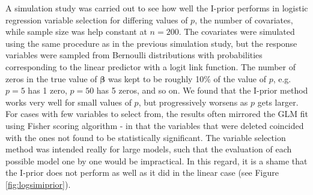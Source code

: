 A simulation study was carried out to see how well the I-prior performs in logistic regression variable selection for differing values of $p$, the number of covariates, while sample size was help constant at $n=200$. The covariates were simulated using the same procedure as in the previous simulation study, but the response variables were sampled from Bernoulli distributions with probabilities corresponding to the linear predictor with a logit link function. The number of zeros in the true value of $\boldsymbol{\beta}$ was kept to be roughly 10\% of the value of $p$, e.g. $p=5$ has 1 zero, $p=50$ has 5 zeros, and so on. We found that the I-prior method works very well for small values of $p$, but progressively worsens as $p$ gets larger. For cases with few variables to select from, the results often mirrored the GLM fit using Fisher scoring algorithm - in that the variables that were deleted coincided with the ones not found to be statistically significant\footnotemark. The variable selection method was intended really for large models, such that the evaluation of each possible model one by one would be impractical.  In this regard, it is a shame that the I-prior does not perform as well as it did in the linear case (see Figure \ref{fig:logsimiprior}).


